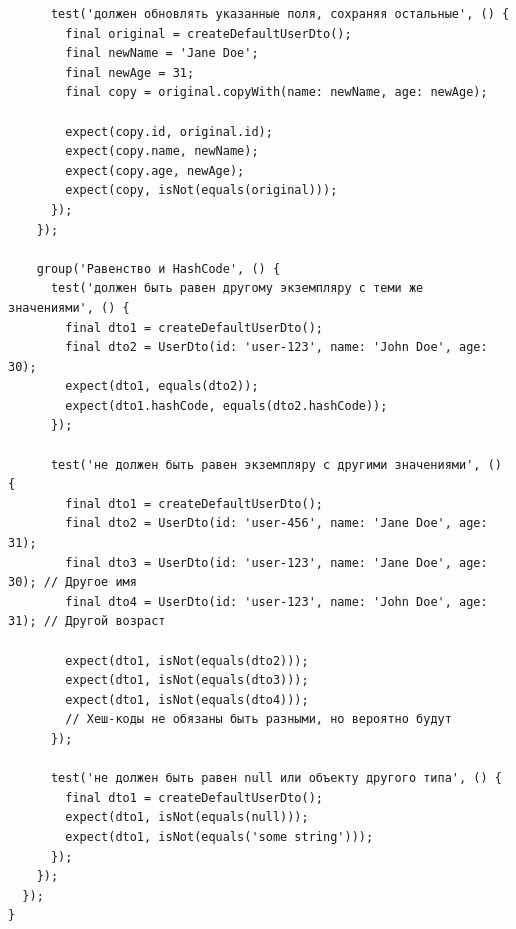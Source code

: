 \documentclass[14pt, russian]{scrartcl}
\begin{document}
\newpage
\begin{listing}[!htb]
\caption{Пример сгенерированного теста для DTO (Dart) - продолжение 2}
\begin{verbatim}
      test('должен обновлять указанные поля, сохраняя остальные', () {
        final original = createDefaultUserDto();
        final newName = 'Jane Doe';
        final newAge = 31;
        final copy = original.copyWith(name: newName, age: newAge);

        expect(copy.id, original.id);
        expect(copy.name, newName);
        expect(copy.age, newAge);
        expect(copy, isNot(equals(original)));
      });
    });

    group('Равенство и HashCode', () {
      test('должен быть равен другому экземпляру с теми же значениями', () {
        final dto1 = createDefaultUserDto();
        final dto2 = UserDto(id: 'user-123', name: 'John Doe', age: 30);
        expect(dto1, equals(dto2));
        expect(dto1.hashCode, equals(dto2.hashCode));
      });

      test('не должен быть равен экземпляру с другими значениями', () {
        final dto1 = createDefaultUserDto();
        final dto2 = UserDto(id: 'user-456', name: 'Jane Doe', age: 31);
        final dto3 = UserDto(id: 'user-123', name: 'Jane Doe', age: 30); // Другое имя
        final dto4 = UserDto(id: 'user-123', name: 'John Doe', age: 31); // Другой возраст

        expect(dto1, isNot(equals(dto2)));
        expect(dto1, isNot(equals(dto3)));
        expect(dto1, isNot(equals(dto4)));
        // Хеш-коды не обязаны быть разными, но вероятно будут
      });

      test('не должен быть равен null или объекту другого типа', () {
        final dto1 = createDefaultUserDto();
        expect(dto1, isNot(equals(null)));
        expect(dto1, isNot(equals('some string')));
      });
    });
  });
}
\end{verbatim}
\end{listing}
\newpage
\end{document}
